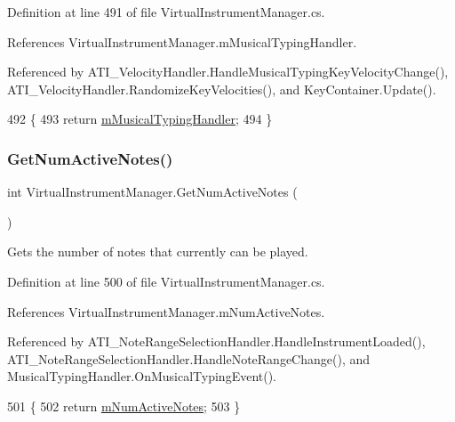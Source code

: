 Definition at line 491 of file Virtual\+Instrument\+Manager.\+cs.



References Virtual\+Instrument\+Manager.\+m\+Musical\+Typing\+Handler.



Referenced by A\+T\+I\+\_\+\+Velocity\+Handler.\+Handle\+Musical\+Typing\+Key\+Velocity\+Change(), A\+T\+I\+\_\+\+Velocity\+Handler.\+Randomize\+Key\+Velocities(), and Key\+Container.\+Update().


\begin{DoxyCode}
492         \{
493             \textcolor{keywordflow}{return} \hyperlink{group___v_i_m_priv_gad7b95bd21383d11ea0cbf33d79b78e09}{mMusicalTypingHandler};
494         \}
\end{DoxyCode}
\mbox{\label{group___v_i_m_pub_func_ga3d6c823b1c1083eac8202f6c89e60b48}} 
\subsubsection{\texorpdfstring{Get\+Num\+Active\+Notes()}{GetNumActiveNotes()}}
{\footnotesize\ttfamily int Virtual\+Instrument\+Manager.\+Get\+Num\+Active\+Notes (\begin{DoxyParamCaption}{ }\end{DoxyParamCaption})}



Gets the number of notes that currently can be played. 



Definition at line 500 of file Virtual\+Instrument\+Manager.\+cs.



References Virtual\+Instrument\+Manager.\+m\+Num\+Active\+Notes.



Referenced by A\+T\+I\+\_\+\+Note\+Range\+Selection\+Handler.\+Handle\+Instrument\+Loaded(), A\+T\+I\+\_\+\+Note\+Range\+Selection\+Handler.\+Handle\+Note\+Range\+Change(), and Musical\+Typing\+Handler.\+On\+Musical\+Typing\+Event().


\begin{DoxyCode}
501     \{
502         \textcolor{keywordflow}{return} \hyperlink{group___v_i_m_priv_ga0f7e11945763c48057be326b661dfdaf}{mNumActiveNotes};
503     \}
\end{DoxyCode}
